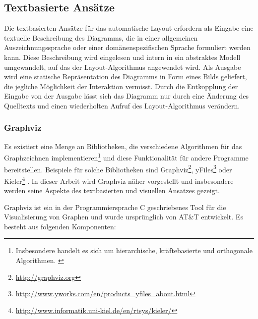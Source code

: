 
\subsection{Textbasierte Ansätze}
\label{subsec:text-based-approaches}

Die textbasierten Ansätze für das automatische Layout erfordern als Eingabe eine textuelle Beschreibung des Diagramms, die in einer allgemeinen Auszeichnungssprache oder einer domänenspezifischen Sprache formuliert werden kann. Diese Beschreibung wird eingelesen und intern in ein abstraktes Modell umgewandelt, auf das der Layout-Algorithmus angewendet wird. Als Ausgabe wird eine statische Repräsentation des Diagramms in Form eines Bilds geliefert, die jegliche Möglichkeit der Interaktion vermisst. Durch die Entkopplung der Eingabe von der Ausgabe lässt sich das Diagramm nur durch eine Änderung des Quelltexts und einen wiederholten Aufruf des Layout-Algorithmus verändern.

\subsubsection{Graphviz}
\label{subsubsec:graphviz}

Es existiert eine Menge an Bibliotheken, die verschiedene Algorithmen für das Graphzeichnen implementieren\footnote{Insbesondere handelt es sich um hierarchische, kräftebasierte und orthogonale Algorithmen. \cite{Maier12A-Pattern-based}} und diese Funktionalität für andere Programme bereitstellen. Beispiele für solche Bibliotheken sind Graphviz\footnote{\url{http://graphviz.org}}, yFiles\footnote{\url{http://www.yworks.com/en/products_yfiles_about.html}} oder Kieler\footnote{\url{http://www.informatik.uni-kiel.de/en/rtsys/kieler/}} \cite{Maier12A-Pattern-based}. In dieser Arbeit wird Graphviz näher vorgestellt und insbesondere werden seine Aspekte des textbasierten und visuellen Ansatzes gezeigt.

Graphviz ist ein in der Programmiersprache C geschriebenes Tool für die Visualisierung von Graphen und wurde ursprünglich von AT\&T entwickelt. Es besteht aus folgenden Komponenten:

